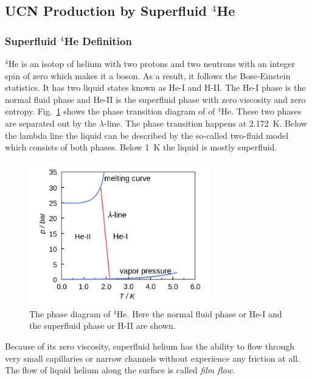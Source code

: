 \subsection{UCN Production by Superfluid $^4$He}

\subsubsection{Superfluid $^4$He Definition}

$^4$He is an isotop of helium with two protons and two neutrons with
an integer spin of zero which makes it a boson. As a result, it
follows the Bose-Einstein statistics. It has two liquid states known
as He-I and H-II. The He-I phase is the normal fluid phase and He-II
is the superfluid phase with zero viscosity and zero
entropy. Fig.~\ref{fig:phasetransition} shows the phase transition
diagram of of $^4$He. These two phases are separated out by the
$\lambda$-line. The phase transition happens at 2.172~K.  Below the
lambda line the liquid can be described by the so-called two-fluid
model which consists of both phases. Below 1~K the liquid is mostly
superfluid.

\begin{figure}[h!]
  \centering \includegraphics[width=0.7\textwidth]{phasetransition.png}
  \caption{The phase diagram of $^4$He. Here the normal fluid phase or
    He-I and the superfluid phase or H-II are shown.}
\label{fig:phasetransition}
\end{figure}

Because of its zero viscosity, superfluid helium has the ability to
flow through very small capillaries or narrow channels without
experience any friction at all. The flow of liquid helium along the
surface is called {\it{film flow}}.
 
 
